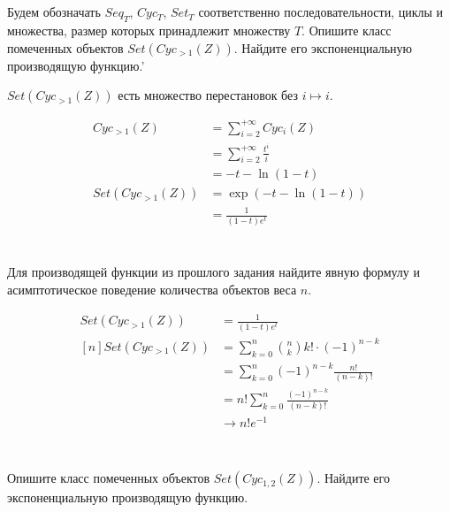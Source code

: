 



\setcounter{section}{81}

\section{}
Будем обозначать \(Seq_T\), \(Cyc_T\), \(Set_T\) соответственно последовательности, циклы и множества, размер которых принадлежит множеству \(T\). Опишите класс помеченных объектов \(Set(Cyc_{> 1}(Z))\). Найдите его экспоненциальную производящую функцию.'

\(Set(Cyc_{ > 1}(Z))\) есть множество перестановок без \(i\mapsto i\).

\begin{align*}
    Cyc_{ > 1}(Z)     & = \sum_{i = 2}^{+\infty} Cyc_i(Z)      \\
                      & = \sum_{i = 2}^{+\infty} \frac{t^i}{i} \\
                      & = - t - \ln(1 - t)                     \\
    Set(Cyc_{> 1}(Z)) & = \exp(- t - \ln(1 - t))               \\
                      & = \frac{1}{(1 - t)e^{t}}
\end{align*}

\section{}
Для производящей функции из прошлого задания найдите явную формулу и асимптотическое поведение количества объектов веса \(n\).

\begin{align*}
    Set(Cyc_{> 1}(Z))     & = \frac{1}{(1 - t)e^{t}}                              \\
    [n]Set(Cyc_{ > 1}(Z)) & = \sum_{k = 0}^n \binom{n}{k} k! \cdot ( - 1)^{n - k} \\
                          & = \sum_{k = 0}^n ( - 1)^{n - k} \frac{n!}{(n - k)!}   \\
                          & = n! \sum_{k = 0}^n \frac{( - 1)^{n - k}}{(n - k)!}   \\
                          & \to n! e^{ - 1}                                       \\
\end{align*}

\section{}
Опишите класс помеченных объектов \(Set(Cyc_{1, 2}(Z))\). Найдите его экспоненциальную производящую функцию.

